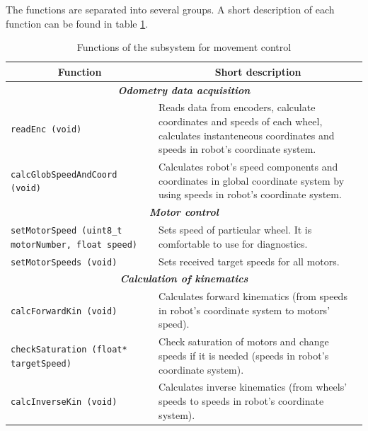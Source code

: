 \documentclass[a4paper,12pt]{article} %
\newcommand{\textitbf}[1]{\textbf{\textit{#1}}}
\newcommand{\inlinecode}[1]{\lstinline{#1}}
\begin{document}
The functions are separated into several groups. A short description of each function can be found in table \ref{tab:functions_for_movement}.

\begin{longtable}[H]{|m{6 cm}|m{7 cm}|}
\caption{ Functions of the subsystem for movement control}\label{tab:functions_for_movement}\\
\hline
\multicolumn{1}{|c|}{Function} & \multicolumn{1}{|c|}{Short description} \\
\hline

\multicolumn{2}{|c|}{\textitbf{Odometry data acquisition}} \\
\hline
\inlinecode{readEnc (void)} & Reads data from encoders, calculate coordinates and speeds of each wheel, calculates instanteneous coordinates and speeds in robot's coordinate system. \\
\hline
\inlinecode{calcGlobSpeedAndCoord (void)}& Calculates robot's speed components and coordinates in global coordinate system by using speeds in robot's coordinate system.\\
\hline

\multicolumn{2}{|c|}{\textitbf{Motor control}} \\
\hline
\inlinecode{setMotorSpeed (uint8_t motorNumber, float speed)} & Sets speed of particular wheel. It is comfortable to use for diagnostics. \\
\hline
\inlinecode{setMotorSpeeds (void)} &Sets received target speeds for all motors. \\
\hline

\multicolumn{2}{|c|}{\textitbf{Calculation of kinematics}}\\
\hline
\inlinecode{calcForwardKin (void)}  & Calculates forward kinematics (from speeds in robot's coordinate system to motors' speed).\\
\hline
\inlinecode{checkSaturation (float* targetSpeed)} & Check saturation of motors and change speeds if it is needed (speeds in robot's coordinate system).\\
\hline
\inlinecode{calcInverseKin (void)} & Calculates inverse kinematics (from wheels' speeds to speeds in robot's coordinate system).\\
\hline


\end{longtable}
\end{document}
